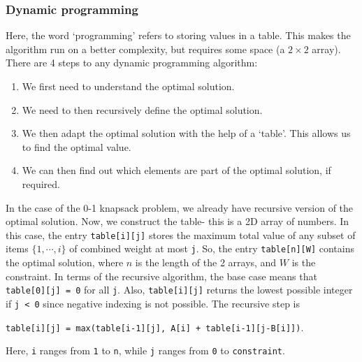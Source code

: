 \documentclass[a4paper, openany]{memoir}
\begin{document}
\subsubsection{Dynamic programming}
Here, the word `programming' refers to storing values in a table. This makes the algorithm run on a better complexity, but requires some space (a $2 \times 2$ array). There are 4 steps to any dynamic programming algorithm:
\begin{enumerate}
    \item We first need to understand the optimal solution.
    \item We need to then recursively define the optimal solution.
    \item We then adapt the optimal solution with the help of a `table'. This allows us to find the optimal value.
    \item We can then find out which elements are part of the optimal solution, if required.
\end{enumerate}
In the case of the 0-1 knapsack problem, we already have recursive version of the optimal solution. Now, we construct the table- this is a 2D array of numbers. In this case, the entry \texttt{table[i][j]} stores the maximum total value of any subset of items $\{1, \cdots, i\}$ of combined weight at most \texttt{j}. So, the entry \texttt{table[n][W]} contains the optimal solution, where $n$ is the length of the 2 arrays, and $W$ is the constraint. In terms of the recursive algorithm, the base case means that \texttt{table[0][j] = 0} for all \texttt{j}. Also, \texttt{table[i][j]} returns the lowest possible integer if \texttt{j < 0} since negative indexing is not possible. The recursive step is
\begin{center}
    \texttt{table[i][j] = max(table[i-1][j], A[i] + table[i-1][j-B[i]])}.
\end{center}
Here, \texttt{i} ranges from \texttt{1} to \texttt{n}, while \texttt{j} ranges from \texttt{0} to \texttt{constraint}.
\end{document}
